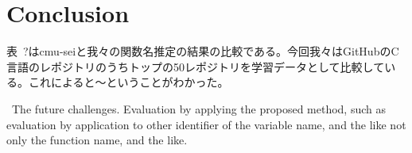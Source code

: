 \documentclass[JIP]{apris}
\begin{document}
\section{Conclusion}
表~?はcmu-seiと我々の関数名推定の結果の比較である。今回我々はGitHubのC言語のレポジトリのうちトップの50レポジトリを学習データとして比較している。これによると〜ということがわかった。

 The future challenges. Evaluation by applying the proposed method, such as evaluation by application to other identifier of the variable name, and the like not only the function name, and the like.







\end{document}
